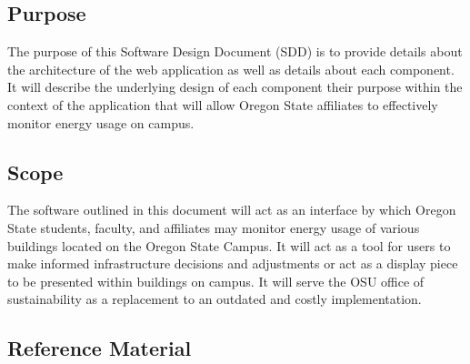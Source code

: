 \documentclass[journal,10pt,onecolumn,compsoc]{IEEEtran}
\begin{document}
    \subsection{Purpose}
	
    The purpose of this Software Design Document (SDD) is to provide details about the architecture of the web application as well
	as details about each component. It will describe the underlying design of each component their purpose within the context
	of the application that will allow Oregon State affiliates to effectively monitor energy usage on campus.
	
    \subsection{Scope}
    
	The software outlined in this document will act as an interface by which Oregon State students, faculty, and affiliates
	may monitor energy usage of various buildings located on the Oregon State Campus. It will act as a tool for users to 
	make informed infrastructure decisions and adjustments or act as a display piece to be presented within buildings on campus.
	It will serve the OSU office of sustainability as a replacement to an outdated and costly implementation. 
	
    \subsection{Reference Material}
\end{document}
